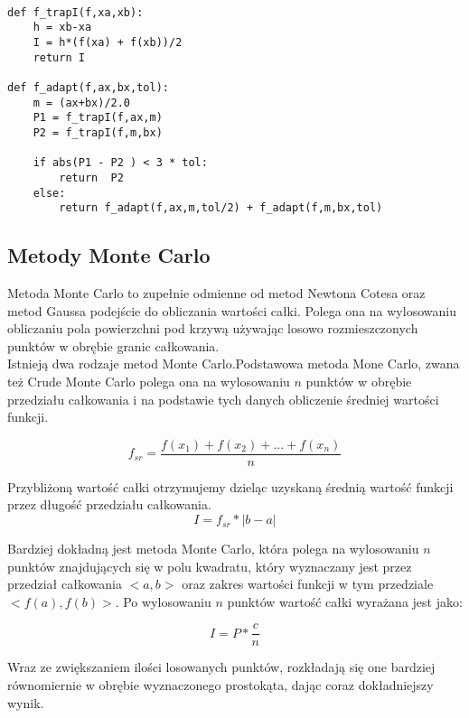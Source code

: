 \documentclass[12pt,twoside]{article}
\begin{document}
\begin{lstlisting}[caption={Kod w języku python implementujący metodę simpsona}]

def f_trapI(f,xa,xb):
    h = xb-xa
    I = h*(f(xa) + f(xb))/2
    return I

def f_adapt(f,ax,bx,tol):
    m = (ax+bx)/2.0
    P1 = f_trapI(f,ax,m)
    P2 = f_trapI(f,m,bx)

    if abs(P1 - P2 ) < 3 * tol:
        return  P2
    else:
        return f_adapt(f,ax,m,tol/2) + f_adapt(f,m,bx,tol)

\end{lstlisting}
\label{Listing 5}

\subsection{Metody Monte Carlo}

Metoda Monte Carlo to zupełnie odmienne od metod Newtona Cotesa oraz metod Gaussa podejście do obliczania wartości całki. Polega ona na wylosowaniu obliczaniu pola powierzchni pod krzywą używając losowo rozmieszczonych punktów w obrębie granic całkowania.\\
Istnieją dwa rodzaje metod Monte Carlo.Podstawowa metoda Mone Carlo, zwana też Crude Monte Carlo polega ona na wylosowaniu $n$ punktów w obrębie przedziału całkowania i na podstawie tych danych obliczenie średniej wartości funkcji. \cite{MonteCarlo_1}

\begin{equation}
f_{sr} = \frac{f(x_1)+f(x_2) + ... + f(x_n)}{n}
\label{Eq:MonteCarlo1}
\end{equation}

Przybliżoną wartość całki otrzymujemy dzieląc uzyskaną średnią wartość funkcji przez długość przedziału całkowania.
\begin{equation}
 I = f_{sr} * |b-a| 
\label{Eq:MonteCarlo2}
\end{equation}

Bardziej dokładną jest metoda Monte Carlo, która polega na wylosowaniu $n$ punktów znajdujących się w polu kwadratu, który wyznaczany jest przez przedział całkowania $<a,b>$ oraz zakres wartości funkcji w tym przedziale $<f(a),f(b)>$. Po wylosowaniu $n$ punktów wartość całki wyrażana jest jako:

\begin{equation}
I = P * \frac{c}{n}
\end{equation}

Wraz ze zwiększaniem ilości losowanych punktów, rozkładają się one bardziej równomiernie w obrębie wyznaczonego prostokąta, dając coraz dokładniejszy wynik.\cite{MonteCarlo_2}
\end{document}
